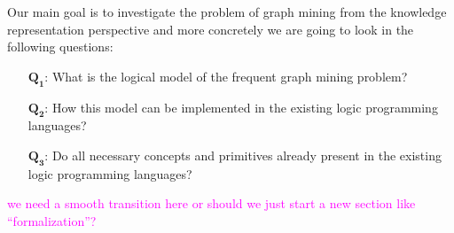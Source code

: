 \documentclass{article}
\theoremstyle{definition}
\newcommand{\sergey}[1]{\textcolor{magenta}{\marginpar{\sc Sergey} #1}}
\newcommand{\matthias}[1]{\textcolor{blue}{\marginpar{\sc Matthias} #1}}
\newcommand{\Qone}{$\boldsymbol{Q_1}$\xspace}
\newcommand{\Qtwo}{$\boldsymbol{Q_2}$\xspace}
\newcommand{\Qthree}{$\boldsymbol{Q_3}$\xspace}
\begin{document}







Our main goal is to investigate the problem of graph mining from the knowledge representation perspective and more concretely we are going to look in the following questions:
\begin{itemize}
  \item[\Qone:]   What is the logical model of the frequent graph mining problem?
  \item[\Qtwo:]   How this model can be implemented in the existing logic programming languages?
  \item[\Qthree:] Do all necessary concepts and primitives already present in the existing logic programming languages?
\end{itemize}

\sergey{we need a smooth transition here or should we just start a new section like ``formalization''?}
\end{document}
